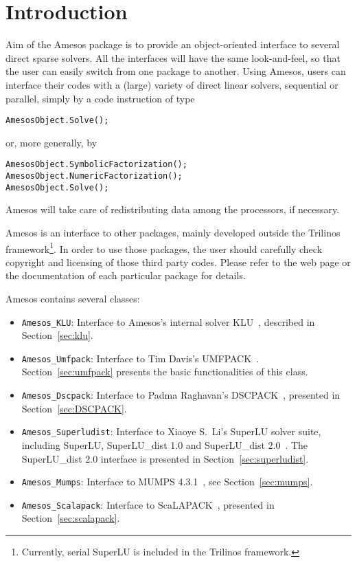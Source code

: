 \documentclass[11pt]{SANDreport}
\begin{document}
\section{Introduction}

Aim of the Amesos package is to provide an object-oriented interface to
several direct sparse solvers. All the interfaces will have the same
look-and-feel, so that the user can easily switch from one package to
another. Using Amesos, users can interface their codes with a (large)
variety of direct linear solvers, sequential or parallel, simply by a
code instruction of type
\begin{verbatim}
AmesosObject.Solve();
\end{verbatim}
or, more generally, by
\begin{verbatim}
AmesosObject.SymbolicFactorization();
AmesosObject.NumericFactorization();
AmesosObject.Solve();
\end{verbatim}
Amesos will take care of redistributing data among the
processors, if necessary.

Amesos is an interface to other packages, mainly developed outside the
Trilinos framework\footnote{Currently, serial SuperLU is included in the
  Trilinos framework.}. In order to use those packages, the user should
carefully check copyright and licensing of those third party codes.
Please refer to the web page or the documentation of each particular
package for details.

Amesos contains several classes: 
\begin{itemize}
\item \verb!Amesos_KLU!: Interface to Amesos's internal solver
  KLU~\cite{KLU}, described in Section~\ref{sec:klu}.
\item \verb!Amesos_Umfpack!: Interface to Tim Davis's
  UMFPACK~\cite{umfpack-home-page}. Section~\ref{sec:umfpack} presents the basic
  functionalities of this class.
\item \verb!Amesos_Dscpack!: Interface to Padma Raghavan's
  DSCPACK~\cite{dscpack-home-page}, presented in Section~\ref{sec:DSCPACK}.
\item \verb!Amesos_Superludist!: Interface to Xiaoye S.~Li's SuperLU
  solver suite, including SuperLU, SuperLU\_dist 1.0 and SuperLU\_dist
  2.0~\cite{superlu-home-page}. The SuperLU\_dist 2.0 interface is
  presented in Section~\ref{sec:superludist}.
\item \verb!Amesos_Mumps!: Interface to MUMPS 4.3.1~\cite{mumps-home-page}, see
  Section~\ref{sec:mumps}.
\item \verb!Amesos_Scalapack!: Interface to ScaLAPACK~\cite{scalapack}, 
  presented in Section~\ref{sec:scalapack}.
\end{itemize}
\end{document}
